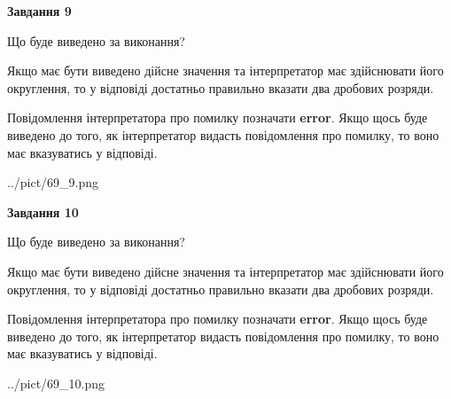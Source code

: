 \documentclass[12pt, ukrainian]{article}
\begin{document}
{\begin {Large}
{\begin {center}\textbf{Завдання 9}\end {center}}\par
Що буде виведено за виконання? \par

Якщо має бути виведено дійсне значення та інтерпретатор має здійснювати його округлення, 
то у відповіді достатньо правильно вказати два дробових розряди.

Повідомлення інтерпретатора про помилку позначати \textbf{error}.
Якщо щось буде виведено до того, як інтерпретатор видасть повідомлення про помилку, 
то воно має вказуватись у відповіді. \par

\begin{center}
	{../pict/69_9.png}
\end{center}
\newpage

{\begin {center}\textbf{Завдання 10}\end {center}}\par
Що буде виведено за виконання? \par

Якщо має бути виведено дійсне значення та інтерпретатор має здійснювати його округлення, 
то у відповіді достатньо правильно вказати два дробових розряди.

Повідомлення інтерпретатора про помилку позначати \textbf{error}.
Якщо щось буде виведено до того, як інтерпретатор видасть повідомлення про помилку, 
то воно має вказуватись у відповіді. \par

\begin{center}
	{../pict/69_10.png}
\end{center}
\newpage

\end {Large}}
\end{document}
